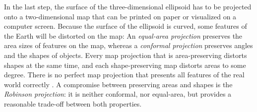 In the last step, the surface of the three-dimensional ellipsoid has to be projected onto a two-dimensional map that can be printed on paper or visualized on a computer screen.
Because the surface of the ellipsoid is curved, some features of the Earth will be distorted on the map: An \emph{equal-area projection} preserves the area sizes of features on the map, whereas a \emph{conformal projection} preserves angles and the shapes of objects. Every map projection that is area-preserving distorts shapes at the same time, and each shape-preserving map distorts areas to some degree. There is no perfect map projection that presents all features of the real world correctly \cite{mapProjectionGeokov}.
A compromise between preserving areas and shapes is the \emph{Robinson projection}: it is neither conformal, nor equal-area, but provides a reasonable trade-off between both properties.


